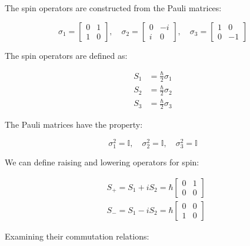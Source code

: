 \documentclass[italian]{HKNdocument}
\begin{document}
The spin operators are constructed from the Pauli matrices:

\[
\sigma_{1}=\left[\begin{array}{ll}
0 & 1  \\
1 & 0
\end{array}\right], \quad \sigma_{2}=\left[\begin{array}{cc}
0 & -i \\
i & 0
\end{array}\right], \quad \sigma_{3}=\left[\begin{array}{cc}
1 & 0 \\
0 & -1
\end{array}\right]
\]

The spin operators are defined as:

\begin{align}
S_{1} & =\frac{\hbar}{2} \sigma_{1} \\
S_{2} & =\frac{\hbar}{2} \sigma_{2}  \\
S_{3} & =\frac{\hbar}{2} \sigma_{3}
\end{align}

The Pauli matrices have the property:

\begin{equation}
\sigma_{1}^{2}=\mathbb{I}, \quad \sigma_{2}^{2}=\mathbb{I}, \quad \sigma_{3}^{2}=\mathbb{I}
\end{equation}

We can define raising and lowering operators for spin:

\begin{align}
& S_{+}=S_{1}+i S_{2}=\hbar\left[\begin{array}{ll}
0 & 1 \\
0 & 0
\end{array}\right] \\
& S_{-}=S_{1}-i S_{2}=\hbar\left[\begin{array}{ll}
0 & 0 \\
1 & 0
\end{array}\right]
\end{align}

Examining their commutation relations:
\end{document}
